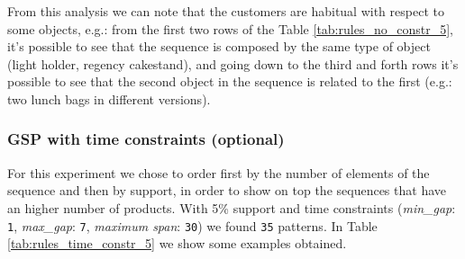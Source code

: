 \documentclass[12pt]{article}
\begin{document}
\begin{table}[H]
\centering
{}
\caption{Sequences ordered by support.}
\label{tab:rules_no_constr_5}
\end{table}

From this analysis we can note that the customers are habitual with respect to some objects, e.g.: from the first two rows of the Table \ref{tab:rules_no_constr_5}, it's possible to see that the sequence is composed by the same type of object (light holder, regency cakestand), and going down to the third and forth rows it's possible to see that the second object in the sequence is related to the first (e.g.: two lunch bags in different versions).

\subsubsection{GSP with time constraints (optional)}
For this experiment we chose to order first by the number of elements of the sequence and then by support, in order to show on top the sequences that have an higher number of products.
With 5\% support and time constraints (\textit{min\_gap}: \texttt{1}, \textit{max\_gap}: \texttt{7}, \textit{maximum span}: \texttt{30}) we found \texttt{35} patterns. In Table \ref{tab:rules_time_constr_5} we show some examples obtained.
\end{document}
